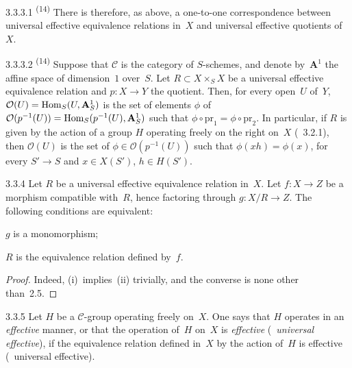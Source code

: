 \begin{scholium}{3.3.3.1}
\label{IV.3.3.3.1}
\textsuperscript{(14)}
There is therefore, as above, a one-to-one correspondence between universal
effective equivalence relations in~\(X\) and universal effective quotients
of~\(X\).
\end{scholium}

\begin{remark}{3.3.3.2}
\label{IV.3.3.3.2}
\textsuperscript{(14)}
Suppose that \(\mathcal{C}\) is the category of \(S\)-schemes, and denote
by~\(\mathbf{A}^{1}\) the affine space of dimension~\(1\) over~\(S\). Let
\(R\subset X\times_{S}X\) be a universal effective equivalence relation and
\(p\colon X\to Y\) the quotient. Then, for every open~\(U\) of~\(Y\),
\(\mathcal{O}(U)=\operatorname{Hom}_{S}(U,\mathbf{A}^{1}_{S})\) is the set of elements
\(\phi\) of
\(\mathcal{O}(p^{-1}(U))=\operatorname{Hom}_{S}(p^{-1}(U),\mathbf{A}^{1}_{S})\) such that
\(\phi\circ\mathrm{pr}_{1}=\phi\circ\mathrm{pr}_{2}\). In particular, if
\(R\) is given by the action of a group \(H\) operating freely on the right
on~\(X\) (\cf~3.2.1), then \(\mathcal{O}(U)\) is the set of
\(\phi\in\mathcal{O}(p^{-1}(U))\) such that \(\phi(xh)=\phi(x)\), for every
\(S'\to S\) and \(x\in X(S')\), \(h\in H(S')\).
\end{remark}

\begin{proposition}{3.3.4}
\label{IV.3.3.4}
Let \(R\) be a universal effective equivalence relation in~\(X\). Let
\(f\colon X\to Z\) be a morphism compatible with~\(R\), hence factoring
through \(g\colon X/R\to Z\). The following conditions are equivalent:
\begin{enumeratei}
\item \(g\) is a monomorphism;
\item \(R\) is the equivalence relation defined by~\(f\).
\end{enumeratei}
\end{proposition}

\begin{proof}
Indeed, (i)~implies~(ii) trivially, and the converse is none other than~2.5.
\end{proof}

\begin{definition}{3.3.5}
\label{IV.3.3.5}
Let \(H\) be a \(\mathcal{C}\)-group operating freely on~\(X\). One says that
\(H\) operates in an \emph{effective} manner, or that the operation of~\(H\)
on~\(X\) is \emph{effective} (\resp\ \emph{universal effective}), if the
equivalence relation defined in~\(X\) by the action of~\(H\) is effective
(\resp\ universal effective).
\end{definition}

